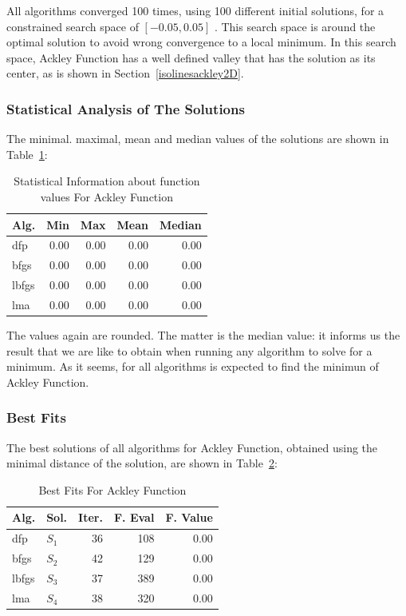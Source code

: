 \documentclass[conference]{IEEEtran}
\begin{document}
All algorithms converged 100 times, using 100 different initial solutions,
for a constrained search space of $\left[-0.05, 0.05\right]$ . This search space is around
the optimal solution to avoid wrong convergence to a local minimum. In this search space,
Ackley Function has a well defined valley that has the solution as its center, as is shown in
Section~\ref{isolinesackley2D}.



\subsubsection{Statistical Analysis of The Solutions}
\label{statisticalanalysisackley2D}


The minimal. maximal, mean and median values of the solutions are shown in Table~\ref{function_values:ackley}:

\begin{table}[H]
\centering
\caption{Statistical Information about function values For Ackley Function}
\label{function_values:ackley}
\begin{tabular}{lrrrr}
\toprule
 Alg. &  Min &  Max &  Mean &  Median \\
\midrule
  dfp & 0.00 & 0.00 &  0.00 &    0.00 \\
 bfgs & 0.00 & 0.00 &  0.00 &    0.00 \\
lbfgs & 0.00 & 0.00 &  0.00 &    0.00 \\
  lma & 0.00 & 0.00 &  0.00 &    0.00 \\
\bottomrule
\end{tabular}
\end{table}

The values again are rounded. The matter is the median value: it informs us the result that
we are like to obtain when running any algorithm to solve for a minimum. As it seems, for all
algorithms is expected to find the minimun of Ackley Function.


\subsubsection{Best Fits}
\label{bestfitsackley2D}


The best solutions of all algorithms for Ackley Function, obtained using the minimal
distance of the solution, are shown in Table~\ref{solutions:ackley}:

\begin{table}[H]
\centering
\caption{Best Fits For Ackley Function}
\label{solutions:ackley}
\begin{tabular}{llrrr}
\toprule
 Alg. &    Sol. &  Iter. &  F. Eval &  F. Value \\
\midrule
  dfp & $S_{1}$ &     36 &      108 &      0.00 \\
 bfgs & $S_{2}$ &     42 &      129 &      0.00 \\
lbfgs & $S_{3}$ &     37 &      389 &      0.00 \\
  lma & $S_{4}$ &     38 &      320 &      0.00 \\
\bottomrule
\end{tabular}
\end{table}
\end{document}
